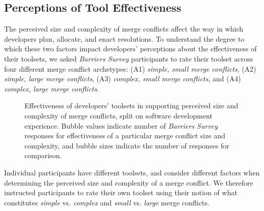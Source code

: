 \subsection{Perceptions of Tool Effectiveness}\label{tool_effectiveness}
The perceived size and complexity of merge conflicts affect the way in which developers plan, allocate, and enact resolutions.
To understand the degree to which these two factors impact developers' perceptions about the effectiveness of their toolsets, we asked \textit{Barriers Survey} participants to rate their toolset across four different merge conflict archetypes: (A1) \textit{simple, small merge conflicts}, (A2) \textit{simple, large merge conflicts}, (A3) \textit{complex, small merge conflicts}, and (A4) \textit{complex, large merge conflicts}.

\begin{figure*}[!htbp]
\centering
{}
\caption{Effectiveness of developers' toolsets in supporting perceived size and complexity of merge conflicts, split on software development experience. Bubble values indicate number of \textit{Barriers Survey} responses for effectiveness of a particular merge conflict size and complexity, and bubble sizes indicate the number of responses for comparison.}
\label{size_vs_complexity}
\end{figure*}


Individual participants have different toolsets, and consider different factors when determining the perceived size and complexity of a merge conflict.
We therefore instructed participants to rate their own toolset using their notion of what constitutes \emph{simple} vs. \emph{complex} and \emph{small} vs. \emph{large} merge conflicts.

